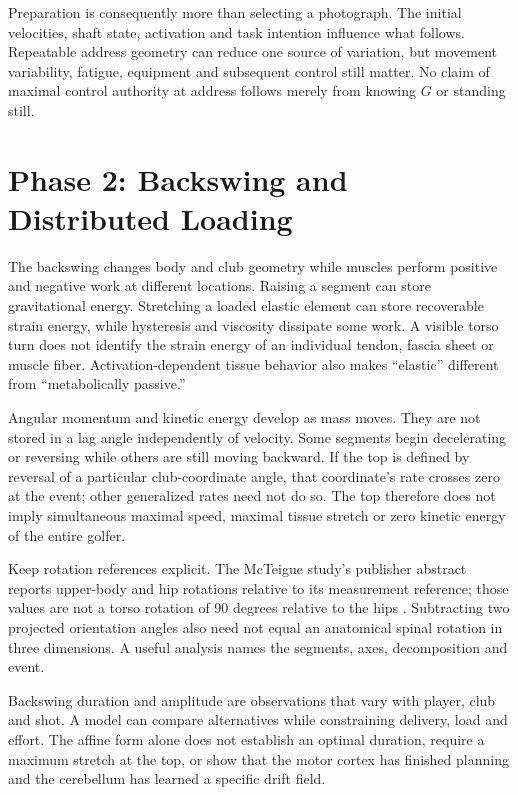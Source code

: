 Preparation is consequently more than selecting a photograph. The initial velocities, shaft state, activation and task intention influence what follows. Repeatable address geometry can reduce one source of variation, but movement variability, fatigue, equipment and subsequent control still matter. No claim of maximal control authority at address follows merely from knowing $G$ or standing still.

\section{Phase 2: Backswing and Distributed Loading}

The backswing changes body and club geometry while muscles perform positive and negative work at different locations. Raising a segment can store gravitational energy. Stretching a loaded elastic element can store recoverable strain energy, while hysteresis and viscosity dissipate some work. A visible torso turn does not identify the strain energy of an individual tendon, fascia sheet or muscle fiber. Activation-dependent tissue behavior also makes ``elastic'' different from ``metabolically passive.''

Angular momentum and kinetic energy develop as mass moves. They are not stored in a lag angle independently of velocity. Some segments begin decelerating or reversing while others are still moving backward. If the top is defined by reversal of a particular club-coordinate angle, that coordinate's rate crosses zero at the event; other generalized rates need not do so. The top therefore does not imply simultaneous maximal speed, maximal tissue stretch or zero kinetic energy of the entire golfer.

Keep rotation references explicit. The McTeigue study's publisher abstract reports upper-body and hip rotations relative to its measurement reference; those values are not a torso rotation of 90 degrees relative to the hips \citep{McTeigue1994}. Subtracting two projected orientation angles also need not equal an anatomical spinal rotation in three dimensions. A useful analysis names the segments, axes, decomposition and event.

Backswing duration and amplitude are observations that vary with player, club and shot. A model can compare alternatives while constraining delivery, load and effort. The affine form alone does not establish an optimal duration, require a maximum stretch at the top, or show that the motor cortex has finished planning and the cerebellum has learned a specific drift field.

